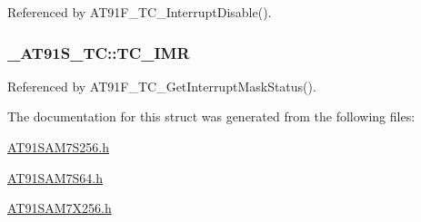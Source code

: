 Referenced by AT91F\_\-TC\_\-InterruptDisable().\hypertarget{struct__AT91S__TC_275722ebb6d9b4d171f09cc1399fdd19}{
\subsubsection{ {\bf \_\-AT91S\_\-TC::TC\_\-IMR}}}
\label{struct__AT91S__TC_275722ebb6d9b4d171f09cc1399fdd19}




Referenced by AT91F\_\-TC\_\-GetInterruptMaskStatus().

The documentation for this struct was generated from the following files:\begin{CompactItemize}
\item 
\hyperlink{AT91SAM7S256_8h}{AT91SAM7S256.h}\item 
\hyperlink{AT91SAM7S64_8h}{AT91SAM7S64.h}\item 
\hyperlink{AT91SAM7X256_8h}{AT91SAM7X256.h}\end{CompactItemize}

